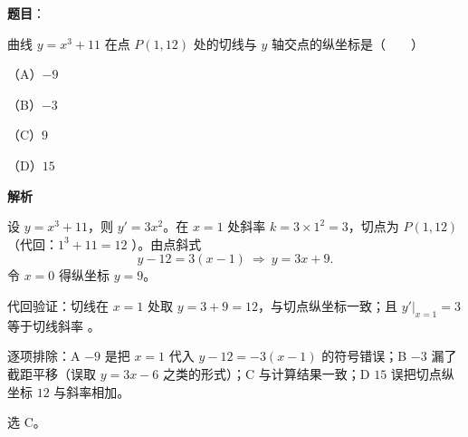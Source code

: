 \begin{answer}

\textbf{题目}：

曲线 $y=x^3+11$ 在点 $P(1,12)$ 处的切线与 $y$ 轴交点的纵坐标是\mbox{（　　）}

（A）$-9$

（B）$-3$

（C）$9$

（D）$15$

\textbf{解析}

设 $y=x^3+11$，则 $y'=3x^2$。在 $x=1$ 处斜率 $k=3\times1^2=3$，切点为 $P(1,12)$（代回：$1^3+11=12$ ）。由点斜式
\nopagebreak[4]
\[
y-12=3(x-1)\ \Longrightarrow\ y=3x+9.
\]
令 $x=0$ 得纵坐标 $y=9$。

代回验证：切线在 $x=1$ 处取 $y=3+9=12$，与切点纵坐标一致；且 $y'|_{x=1}=3$ 等于切线斜率 。

逐项排除：A $-9$ 是把 $x=1$ 代入 $y-12=-3(x-1)$ 的符号错误；B $-3$ 漏了截距平移（误取 $y=3x-6$ 之类的形式）；C 与计算结果一致；D $15$ 误把切点纵坐标 $12$ 与斜率相加。

选 C。


\end{answer}
